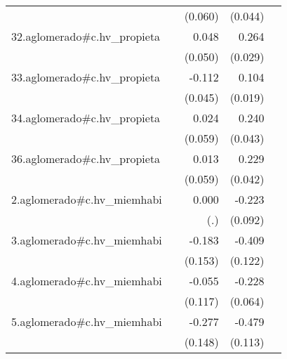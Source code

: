 {\begin{longtable}{l*{4}{D{.}{.}{-1}}}
            &                     &     (0.060)         &     (0.044)         &                     \\
\addlinespace
32.aglomerado#c.hv\_propieta&                     &       0.048         &       0.264\sym{***}&                     \\
            &                     &     (0.050)         &     (0.029)         &                     \\
\addlinespace
33.aglomerado#c.hv\_propieta&                     &      -0.112\sym{*}  &       0.104\sym{***}&                     \\
            &                     &     (0.045)         &     (0.019)         &                     \\
\addlinespace
34.aglomerado#c.hv\_propieta&                     &       0.024         &       0.240\sym{***}&                     \\
            &                     &     (0.059)         &     (0.043)         &                     \\
\addlinespace
36.aglomerado#c.hv\_propieta&                     &       0.013         &       0.229\sym{***}&                     \\
            &                     &     (0.059)         &     (0.042)         &                     \\
\addlinespace
2.aglomerado#c.hv\_miemhabi&                     &       0.000         &      -0.223\sym{*}  &                     \\
            &                     &         (.)         &     (0.092)         &                     \\
\addlinespace
3.aglomerado#c.hv\_miemhabi&                     &      -0.183         &      -0.409\sym{***}&                     \\
            &                     &     (0.153)         &     (0.122)         &                     \\
\addlinespace
4.aglomerado#c.hv\_miemhabi&                     &      -0.055         &      -0.228\sym{***}&                     \\
            &                     &     (0.117)         &     (0.064)         &                     \\
\addlinespace
5.aglomerado#c.hv\_miemhabi&                     &      -0.277         &      -0.479\sym{***}&                     \\
            &                     &     (0.148)         &     (0.113)         &                     \\

\end{longtable}}
